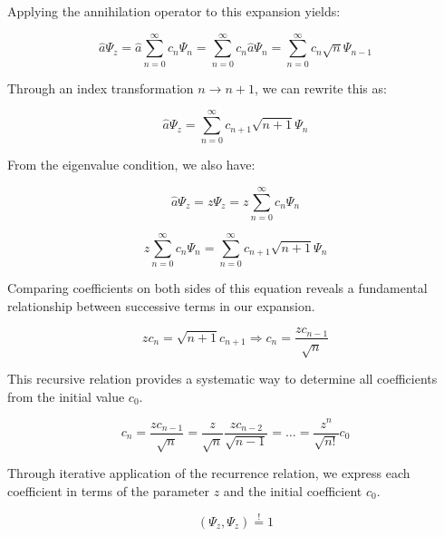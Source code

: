 \documentclass[italian]{HKNdocument}
\begin{document}
Applying the annihilation operator to this expansion yields:

\begin{equation}
\hat{a} \Psi_{z}=\hat{a} \sum_{n=0}^{\infty} c_{n} \Psi_{n}=\sum_{n=0}^{\infty} c_{n} \hat{a} \Psi_{n}=\sum_{n=0}^{\infty} c_{n} \sqrt{n} \Psi_{n-1} \label{eq:7.79}
\end{equation}

Through an index transformation $n \rightarrow n+1$, we can rewrite this as:

\begin{equation}
\hat{a} \Psi_{z}=\sum_{n=0}^{\infty} c_{n+1} \sqrt{n+1} \Psi_{n} \label{eq:7.80}
\end{equation}

From the eigenvalue condition, we also have:

\begin{equation}
\hat{a} \Psi_{z}=z \Psi_{z}=z \sum_{n=0}^{\infty} c_{n} \Psi_{n} \label{eq:7.81}
\end{equation}

\begin{equation}
z \sum_{n=0}^{\infty} c_{n} \Psi_{n}=\sum_{n=0}^{\infty} c_{n+1} \sqrt{n+1} \Psi_{n} \label{eq:7.82}
\end{equation}

Comparing coefficients on both sides of this equation reveals a fundamental relationship between successive terms in our expansion.

\begin{equation}
z c_{n}=\sqrt{n+1} c_{n+1} \Longrightarrow c_{n}=\frac{z c_{n-1}}{\sqrt{n}} \label{eq:7.83}
\end{equation}

This recursive relation provides a systematic way to determine all coefficients from the initial value $c_0$.

\begin{equation}
c_{n}=\frac{z c_{n-1}}{\sqrt{n}}=\frac{z}{\sqrt{n}} \frac{z c_{n-2}}{\sqrt{n-1}}=\ldots=\frac{z^{n}}{\sqrt{n!}} c_{0} \label{eq:7.84}
\end{equation}

Through iterative application of the recurrence relation, we express each coefficient in terms of the parameter $z$ and the initial coefficient $c_0$.

\begin{equation}
\left(\Psi_{z}, \Psi_{z}\right) \stackrel{!}{=} 1 \label{eq:7.85}
\end{equation}
\end{document}
